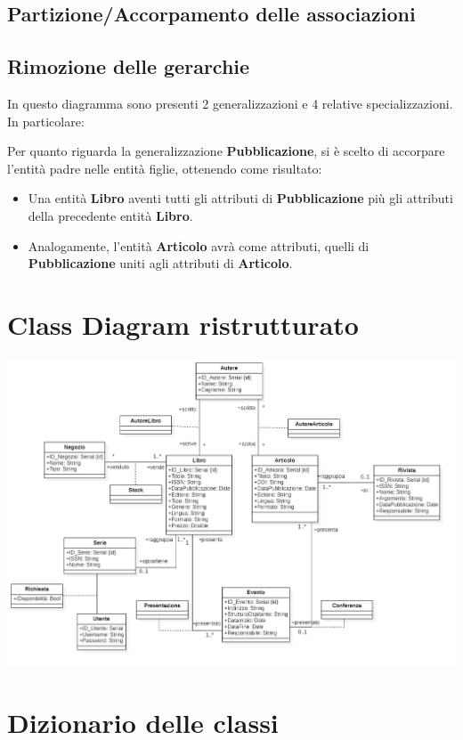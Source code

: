         \subsection{Partizione/Accorpamento delle associazioni}
            
        \subsection{Rimozione delle gerarchie}
            In questo diagramma sono presenti 2 generalizzazioni e 4 relative specializzazioni.
            In particolare:

            Per quanto riguarda la generalizzazione \textbf{Pubblicazione}, si è scelto di accorpare l'entità padre
            nelle entità figlie, ottenendo come risultato:
            \begin{itemize}
                  \item Una entità \textbf{Libro} aventi tutti gli attributi di \textbf{Pubblicazione} più
                        gli attributi della precedente entità \textbf{Libro}.
                  \item Analogamente, l'entità \textbf{Articolo} avrà come attributi, quelli di \textbf{Pubblicazione}
                        uniti agli attributi di \textbf{Articolo}.
            \end{itemize}
    
    \section{Class Diagram ristrutturato}
    \includegraphics[scale=0.25]{Immagini/SchemaRistrutturato.png}
    \pagebreak
    \section{Dizionario delle classi}

